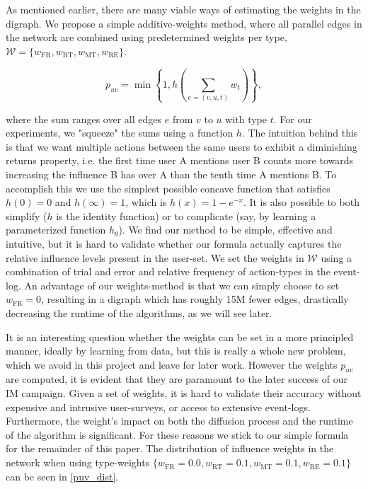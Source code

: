 \documentclass[sigconf]{acmart}
\begin{document}
As mentioned earlier, there are many viable ways of estimating the weights in the digraph. We propose a simple additive-weights method, where all parallel edges in the network are combined using predetermined weights per type, \hspace{0.02cm}$\mathcal{W} = \{w_{\text{FR}}, w_{\text{RT}}, w_{\text{MT}}, w_{\text{RE}}\}$.

\begin{equation}
p_{uv} = \min \left\{1, 
h\left(\sum_{e = (v, u, t)}w_t\right) \right\},
\end{equation}

where the sum ranges over all edges $e$ from $v$ to $u$ with type $t$. For our experiments, we "squeeze" the sums using a function $h$. The intuition behind this is that we want multiple actions between the same users to exhibit a diminishing returns property, i.e. the first time user A mentions user B counts more towards increasing the influence B has over A than the tenth time A mentions B. To accomplish this we use the simplest possible concave function that satisfies $h(0) = 0$ and $h(\infty) = 1$, which is $h(x) = 1 - e^{-x}$. It is also possible to both simplify ($h$ is the identity function) or to complicate (say, by learning a parameterized function $h_{\theta}$). We find our method to be simple, effective and intuitive, but it is hard to validate whether our formula actually captures the relative influence levels present in the user-set. We set the weights in $\mathcal{W}$ using a combination of trial and error and relative frequency of action-types in the event-log. An advantage of our weights-method is that we can simply choose to set $w_{\text{FR}} = 0$, resulting in a digraph which has roughly 15M fewer edges, drastically decreasing the runtime of the algorithms, as we will see later. 

It is an interesting question whether the weights can be set in a more principled manner, ideally by learning from data, but this is really a whole new problem, which we avoid in this project and leave for later work. However the weights $p_{uv}$ are computed, it is evident that they are paramount to the later success of our IM campaign. Given a set of weights, it is hard to validate their accuracy without expensive and intrusive user-surveys, or access to extensive event-logs. Furthermore, the weight's impact on both the diffusion process and the runtime of the algorithm is significant. For these reasons we stick to our simple formula for the remainder of this paper. The distribution of influence weights in the network when using type-weights $\{w_{\text{FR}} = 0.0, w_{\text{RT}} = 0.1, w_{\text{MT}} = 0.1, w_{\text{RE}} = 0.1\}$ can be seen in \autoref{puv_dist}.
\end{document}
